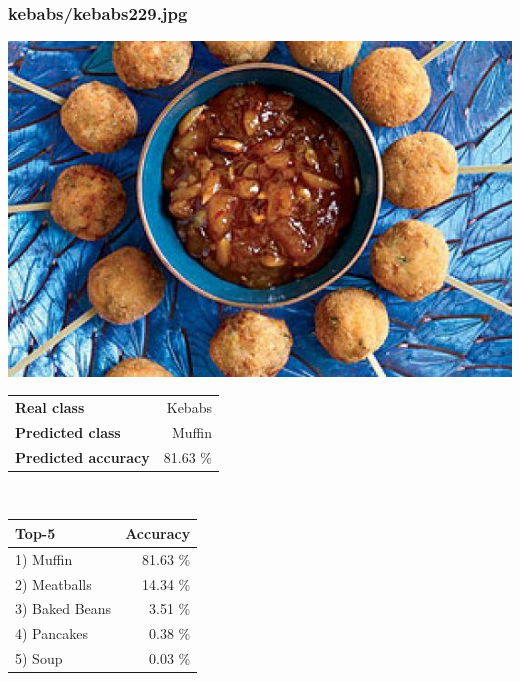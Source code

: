 \subsubsection{kebabs/kebabs229.jpg}

\begin{minipage}[t]{0.4\textwidth}
	\vspace{0pt}
	\includegraphics[width=\linewidth]{images/evaluation-images/kebabs/kebabs229.jpg}
\end{minipage}
\hfill
\begin{minipage}[t]{0.5\textwidth}
	\vspace{0pt}\raggedright
	\begin{tabularx}{\textwidth}{X r}
		\small \textbf{Real class} & \small Kebabs\\
		\small \textbf{Predicted class} & \small Muffin\\
		\small \textbf{Predicted accuracy} & \small 81.63 \%
    \end{tabularx}\\
    
    \vspace{6pt}
	\begin{tabularx}{\textwidth}{X r}
        \small \textbf{Top-5} & \small \textbf{Accuracy} \\
        \hline
		\small 1) Muffin & \small 81.63 \%\\\small 2) Meatballs & \small 14.34 \%\\\small 3) Baked Beans & \small 3.51 \%\\\small 4) Pancakes & \small 0.38 \%\\\small 5) Soup & \small 0.03 \%
    \end{tabularx}
\end{minipage}
    

